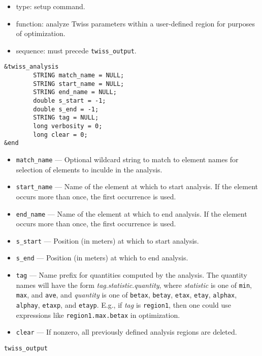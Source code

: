\documentclass[11pt]{article}
\begin{document}
\begin{itemize}
\item type: setup command.
\item function: analyze Twiss parameters within a user-defined region for purposes of
        optimization.
\item sequence: must precede \verb|twiss_output|.
\end{itemize}

\begin{verbatim}
&twiss_analysis
        STRING match_name = NULL;
        STRING start_name = NULL;
        STRING end_name = NULL;
        double s_start = -1;
        double s_end = -1;
        STRING tag = NULL;
        long verbosity = 0;
        long clear = 0;
&end
\end{verbatim}

\begin{itemize}
\item \verb|match_name| --- Optional wildcard string to match to element names for selection
  of elements to inculde in the analysis.
\item \verb|start_name| --- Name of the element at which to start analysis.  If the
        element occurs more than once, the first occurrence is used.
\item \verb|end_name| --- Name of the element at which to end analysis.  If the
        element occurs more than once, the first occurrence is used.
\item \verb|s_start| --- Position (in meters) at which to start analysis.
\item \verb|s_end| --- Position (in meters) at which to end analysis.
\item \verb|tag| --- Name prefix for quantities computed by the analysis.  The quantity
        names will have the form {\em tag}.{\em statistic}.{\em quantity}, where {\em statistic}
        is one of \verb|min|, \verb|max|, and \verb|ave|, and {\em quantity} is one of
        \verb|betax|, \verb|betay|, \verb|etax|, \verb|etay|, \verb|alphax|, \verb|alphay|, 
        \verb|etaxp|, and \verb|etayp|. E.g., if {\em tag} is \verb|region1|,
        then one could use expressions like \verb|region1.max.betax| in optimization.
\item \verb|clear| --- If nonzero, all previously defined analysis regions are deleted.
\end{itemize}

\newpage
\begin{center}{\Large\verb|twiss_output|}\end{center}
\end{document}
